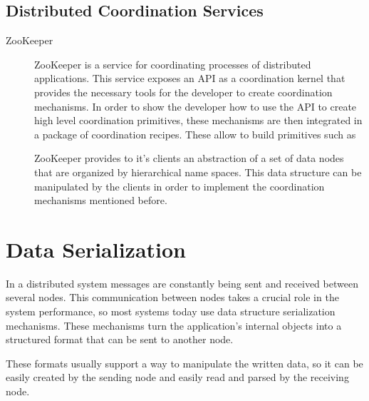 \subsection{Distributed Coordination Services}

\begin{description}

\item[ZooKeeper ~\cite{zookeeper}] ZooKeeper is a service for coordinating processes of distributed applications. This service exposes an API as a coordination kernel that provides the necessary tools for the developer to create coordination mechanisms. In order to show the developer how to use the API to create high level coordination primitives, these mechanisms are then integrated in a package of coordination recipes. These allow to build primitives such as 
\par
	ZooKeeper provides to it's clients an abstraction of a set of data nodes that are organized by hierarchical name spaces. This data structure can be manipulated by the clients in order to implement the coordination mechanisms mentioned before.

\end{description}

\section{Data Serialization}
\label{sec:data_serialization}

In a distributed system messages are constantly being sent and received between several nodes. This communication between nodes takes a crucial role in the system performance\cite{serialization}, so most systems today use data structure serialization mechanisms. These mechanisms turn the application's internal objects into a structured format that can be sent to another node.\par
	These formats usually support a way to manipulate the written data, so it can be easily created by the sending node and easily read and parsed by the receiving node.

